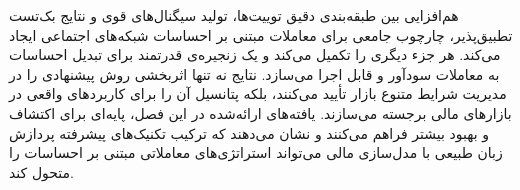 هم‌افزایی بین طبقه‌بندی دقیق توییت‌ها، تولید سیگنال‌های قوی و نتایج بک‌تست تطبیق‌پذیر، چارچوب جامعی برای معاملات مبتنی بر احساسات شبکه‌های اجتماعی ایجاد می‌کند. هر جزء دیگری را تکمیل می‌کند و یک زنجیره‌ی قدرتمند برای تبدیل احساسات به معاملات سودآور و قابل اجرا می‌سازد. نتایج نه تنها اثربخشی روش پیشنهادی را در مدیریت شرایط متنوع بازار تأیید می‌کنند، بلکه پتانسیل آن را برای کاربردهای واقعی در بازارهای مالی برجسته می‌سازند. یافته‌های ارائه‌شده در این فصل، پایه‌ای برای اکتشاف و بهبود بیشتر فراهم می‌کنند و نشان می‌دهند که ترکیب تکنیک‌های پیشرفته پردازش زبان طبیعی با مدل‌سازی مالی می‌تواند استراتژی‌های معاملاتی مبتنی بر احساسات را متحول کند.
